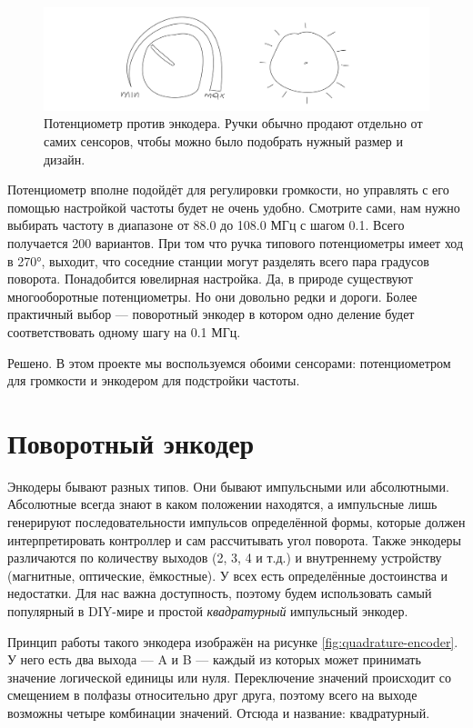\begin{figure}
  \centering
  \includegraphics{sketches/pot-vs-encoder}
  \caption{Потенциометр против энкодера. Ручки обычно продают отдельно от самих сенсоров, чтобы можно было подобрать нужный размер и дизайн.}
\end{figure}

Потенциометр вполне подойдёт для регулировки громкости, но управлять с его помощью настройкой частоты будет не очень удобно. Смотрите сами, нам нужно выбирать частоту в диапазоне от 88.0 до 108.0 МГц с шагом 0.1. Всего получается 200 вариантов. При том что ручка типового потенциометры имеет ход в 270°, выходит, что соседние станции могут разделять всего пара градусов поворота. Понадобится ювелирная настройка. Да, в природе существуют многооборотные потенциометры. Но они довольно редки и дороги. Более практичный выбор — поворотный энкодер в котором одно деление будет соответствовать одному шагу на 0.1 МГц.

Решено. В этом проекте мы воспользуемся обоими сенсорами: потенциометром для громкости и энкодером для подстройки частоты.

\section{Поворотный энкодер}

Энкодеры бывают разных типов. Они бывают импульсными или абсолютными. Абсолютные всегда знают в каком положении находятся, а импульсные лишь генерируют последовательности импульсов определённой формы, которые должен интерпретировать контроллер и сам рассчитывать угол поворота. Также энкодеры различаются по количеству выходов (2, 3, 4 и т.д.) и внутреннему устройству (магнитные, оптические, ёмкостные). У всех есть определённые достоинства и недостатки. Для нас важна доступность, поэтому будем использовать самый популярный в DIY-мире и простой \emph{квадратурный} импульсный энкодер.

Принцип работы такого энкодера изображён на рисунке \ref{fig:quadrature-encoder}. У него есть два выхода — A и B — каждый из которых может принимать значение логической единицы или нуля. Переключение значений происходит со смещением в полфазы относительно друг друга, поэтому всего на выходе возможны четыре комбинации значений. Отсюда и название: квадратурный.

